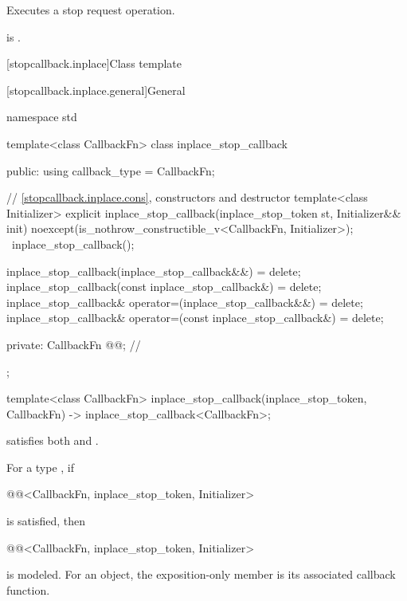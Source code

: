 \begin{itemdescr}
\pnum
\effects
Executes a stop request operation.

\pnum
\ensures
{} is .
\end{itemdescr}

[stopcallback.inplace]{Class template }

[stopcallback.inplace.general]{General}

\begin{codeblock}
namespace std {
  template<class CallbackFn>
  class inplace_stop_callback {
  public:
    using callback_type = CallbackFn;

    // \ref{stopcallback.inplace.cons}, constructors and destructor
    template<class Initializer>
      explicit inplace_stop_callback(inplace_stop_token st, Initializer&& init)
        noexcept(is_nothrow_constructible_v<CallbackFn, Initializer>);
    ~inplace_stop_callback();

    inplace_stop_callback(inplace_stop_callback&&) = delete;
    inplace_stop_callback(const inplace_stop_callback&) = delete;
    inplace_stop_callback& operator=(inplace_stop_callback&&) = delete;
    inplace_stop_callback& operator=(const inplace_stop_callback&) = delete;

  private:
    CallbackFn @@;                                     // \expos
  };

  template<class CallbackFn>
    inplace_stop_callback(inplace_stop_token, CallbackFn)
      -> inplace_stop_callback<CallbackFn>;
}
\end{codeblock}

\pnum
\mandates
{} satisfies both
 and .

\pnum
\remarks
For a type , if
\begin{codeblock}
@@<CallbackFn, inplace_stop_token, Initializer>
\end{codeblock}
is satisfied, then
\begin{codeblock}
@@<CallbackFn, inplace_stop_token, Initializer>
\end{codeblock}
is modeled.
For an  object,
the exposition-only  member is
its associated callback function.

